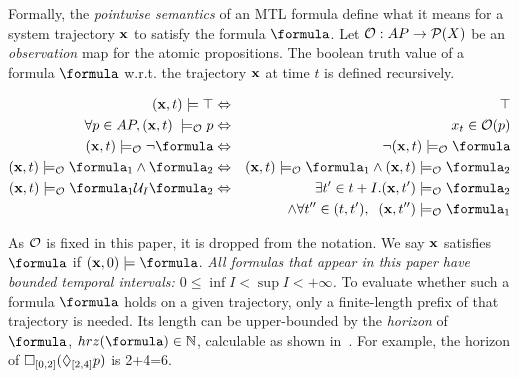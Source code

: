 Formally, the \textit{pointwise semantics} of an MTL formula define what it means for a system trajectory $\mathbf{x}$ to satisfy the formula $\formula$.
Let $\mathcal{O}: AP \rightarrow \mathcal{P}(X)$ be an \textit{observation} map for the atomic propositions.
The boolean truth value of a formula $\formula$ w.r.t. the trajectory $\mathbf{x}$ at time $t$ is defined recursively.
\begin{definition}
	\label{def:boolean sat}
	\begin{eqnarray*}
		\label{eq:boolean sat}
		(\sstraj,t) \models \top &\Leftrightarrow& \top
		\\
		\forall p \in AP, (\sstraj, t) \; \models_\Oc p &\Leftrightarrow& x_t \in \Oc(p)
		\\
		(\sstraj,t) \models_\Oc \neg \formula&\Leftrightarrow& \neg (\sstraj,t) \models_\Oc \formula
		\\
		(\sstraj,t) \models_\Oc  \formula_1 \land \formula_2&\Leftrightarrow& (\sstraj,t) \models_\Oc \formula_1 \land (\sstraj,t) \models_\Oc \formula_2
		\\
		(\sstraj,t) \models_\Oc \formula_1 \until_I \formula_2 &\Leftrightarrow& \exists t' \in t+I .  (\sstraj,t') \models_\Oc \formula_2  
		\\
		&& \, \land \forall t'' \in (t,t'), \;\; (\sstraj,t'') \models_\Oc \formula_1 
	\end{eqnarray*}
\end{definition}
As $\mathcal{O}$ is fixed in this paper, it is dropped from the notation.
We say $\mathbf{x}$ satisfies $\formula$ if $(\sstraj,0) \models \formula$.
\textit{All formulas that appear in this paper have bounded temporal intervals: $ 0\leq \inf I < \sup I < +\infty$.}
To evaluate whether such a formula $\formula$ holds on a given trajectory, only a finite-length prefix of that trajectory is needed.
Its length can be upper-bounded by the \textit{horizon} of $\formula$, $hrz(\formula) \in \Ne$, calculable as shown in~\cite{Dokhanchi14_OnlineMonitoring}. 
For example, the horizon of $\square_{[0,2]}(\Diamond_{[2,4]}p)$ is 2+4=6.

